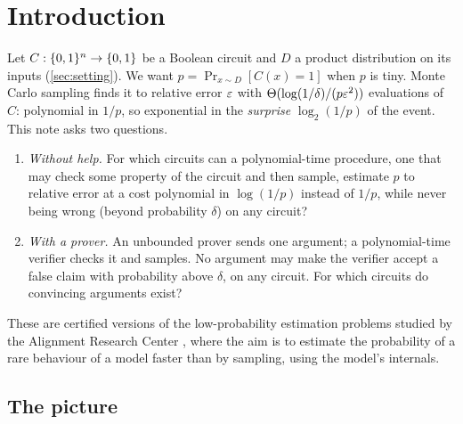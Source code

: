 \section{Introduction}\label{sec:intro}

Let $C:\{0,1\}^n\to\{0,1\}$ be a Boolean circuit and $D$ a product distribution on its
inputs (\cref{sec:setting}).
We want $p=\Pr_{x\sim D}[C(x)=1]$ when $p$ is tiny. Monte Carlo sampling finds
it to relative error $\varepsilon$ with $\Theta(\log(1/\delta)/(p\varepsilon^2))$ evaluations
of $C$: polynomial in $1/p$, so exponential in the \emph{surprise}
$\log_2(1/p)$ of the event. This note asks two questions.
\begin{enumerate}
\item \emph{Without help.} For which circuits can a polynomial-time procedure,
one that may check some property of the circuit and then sample, estimate $p$
to relative error at a cost polynomial in $\log(1/p)$ instead of $1/p$, while
never being wrong (beyond probability $\delta$) on any circuit?
\item \emph{With a prover.} An unbounded prover sends one argument; a
polynomial-time verifier checks it and samples. No argument may make the
verifier accept a false claim with probability above $\delta$, on any circuit.
For which circuits do convincing arguments exist?
\end{enumerate}
These are certified versions of the low-probability estimation problems studied
by the Alignment Research Center \cite{wu2024lowprob,christiano2022presumption},
where the aim is to estimate the probability of a rare behaviour of a model
faster than by sampling, using the model's internals.

\subsection{The picture}

